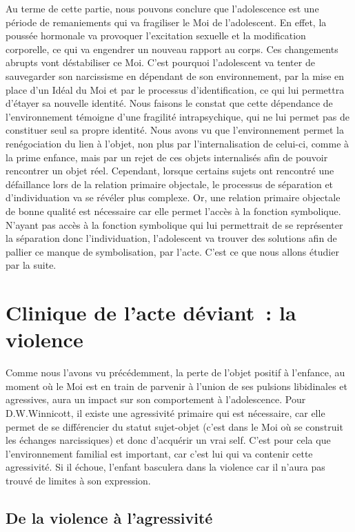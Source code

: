 \documentclass[12pt, a4paper]{book}
\begin{document}
\begin{spacing}{1.5}
Au terme de cette partie, nous pouvons conclure que l'adolescence est  une période de remaniements qui va fragiliser le Moi de l'adolescent. En effet, la poussée hormonale  va provoquer l'excitation sexuelle et la modification corporelle, ce qui va engendrer un nouveau rapport au corps. Ces changements abrupts vont déstabiliser ce Moi. C'est pourquoi l'adolescent va tenter de sauvegarder son narcissisme en dépendant de son environnement, par la mise en place d'un Idéal du Moi et par le processus d'identification, ce qui lui permettra d'étayer sa nouvelle identité. Nous faisons le constat que cette dépendance de l'environnement témoigne d'une fragilité intrapsychique, qui ne lui permet pas de constituer seul sa propre identité. Nous avons vu que l'environnement permet la renégociation du lien à l'objet, non plus par l'internalisation de celui-ci, comme à la prime enfance, mais par un rejet de ces objets internalisés afin de pouvoir rencontrer un objet réel. Cependant, lorsque certains sujets ont rencontré une défaillance lors de la relation primaire objectale, le processus de séparation et d'individuation va se révéler plus complexe. Or, une relation primaire objectale de bonne qualité est nécessaire car elle permet l'accès à la fonction symbolique. N'ayant pas accès à la fonction symbolique qui lui permettrait de se représenter la séparation donc l'individuation, l'adolescent va trouver des solutions afin de pallier ce manque de symbolisation, par l'acte. C'est ce que nous allons étudier par la suite.

\chapter{Clinique de l'acte déviant : la violence}

Comme nous l'avons vu précédemment, la perte de l'objet positif à l'enfance, au moment où le Moi est en train de parvenir à l'union de ses pulsions libidinales et agressives, aura un impact sur son comportement à l'adolescence. Pour D.W.Winnicott, il existe une agressivité primaire qui est nécessaire, car elle permet de se différencier du statut  sujet-objet (c'est dans le Moi où se construit les échanges narcissiques) et donc d'acquérir un vrai self. C'est pour cela que l'environnement familial est important, car c'est lui qui va contenir cette agressivité. Si il échoue, l'enfant basculera dans la violence car il n'aura pas trouvé de limites à son expression. 

\section{De la violence à l'agressivité}


\end{spacing}
\end{document}
